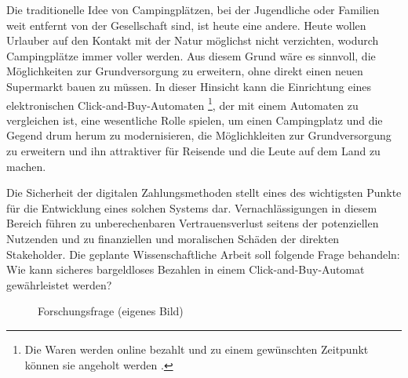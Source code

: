 Die traditionelle Idee von Campingplätzen, bei der Jugendliche oder Familien weit entfernt von der 
Gesellschaft sind, ist heute eine andere. Heute wollen Urlauber auf den Kontakt mit der Natur
möglichst nicht verzichten, wodurch Campingplätze immer voller werden. Aus diesem Grund wäre es
sinnvoll, die Möglichkeiten zur Grundversorgung zu erweitern, ohne direkt einen neuen Supermarkt
bauen zu müssen. In dieser Hinsicht kann die Einrichtung eines elektronischen Click-and-Buy-Automaten
\footnote{Die Waren werden online bezahlt und zu einem gewünschten Zeitpunkt können sie angeholt
werden \cite{refart:ECPG}.}, der mit einem Automaten zu vergleichen ist, eine wesentliche Rolle 
spielen, um einen Campingplatz und die Gegend drum herum zu modernisieren, die Möglichkleiten 
zur Grundversorgung zu erweitern und ihn attraktiver für Reisende und die Leute auf dem Land zu machen.

Die Sicherheit der digitalen Zahlungsmethoden stellt eines des wichtigsten Punkte für die Entwicklung
eines solchen Systems dar. Vernachlässigungen in diesem Bereich führen zu unberechenbaren Vertrauensverlust 
seitens der potenziellen Nutzenden und zu finanziellen und moralischen Schäden der direkten
Stakeholder. Die geplante Wissenschaftliche Arbeit soll folgende Frage behandeln:
Wie kann sicheres bargeldloses Bezahlen in einem Click-and-Buy-Automat gewährleistet werden? 

\vspace*{1cm}
\begin{figure}[H]
    \caption{Forschungsfrage (eigenes Bild)}
    \label{fig:diagramrecherche}
\end{figure}